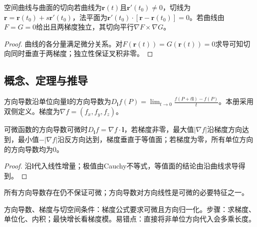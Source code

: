 \begin{theorem}{空间曲线与曲面的切向}若曲线为$\bm r(t)$且$\bm r\prime(t_0)\ne0$，切线为$\bm r=\bm r(t_0)+s\bm r\prime(t_0)$，法平面为$\bm r\prime(t_0)\cdot[\bm r-\bm r(t_0)]=0$。若曲线由$F=G=0$给出且两梯度独立，其切向平行$\nabla F\times\nabla G$。\end{theorem}
\begin{proof}曲线的各分量满足微分关系。对$F(\bm r(t))=G(\bm r(t))=0$求导可知切向同时垂直于两梯度；独立性保证叉积非零。\end{proof}

\subsection{概念、定理与推导}

\begin{definition}{方向导数}沿单位向量$\bm l$的方向导数为$D_{\bm l}f(P)=\lim_{t\to0}\frac{f(P+t\bm l)-f(P)}{t}$。本册采用双侧定义。梯度为$\nabla f=(f_x,f_y,f_z)$。\end{definition}
\begin{theorem}{可微函数的方向导数}可微时$D_{\bm l}f=\nabla f\cdot\bm l$，若梯度非零，最大值$|\nabla f|$沿梯度方向达到，最小值$-|\nabla f|$沿反方向达到，梯度垂直于等值面；若梯度为零，所有单位方向的方向导数均为0。\end{theorem}
\begin{proof}沿$\bm l$代入线性增量；极值由Cauchy不等式，等值面的结论由沿曲线求导得到。\end{proof}
所有方向导数存在仍不保证可微；方向导数对方向线性是可微的必要特征之一。

\begin{method}{方向导数、梯度与切空间}条件：梯度公式要求可微且方向归一化。步骤：求梯度、单位化、内积；最快增长看梯度模。易错点：直接将非单位方向代入会多乘长度。\end{method}
